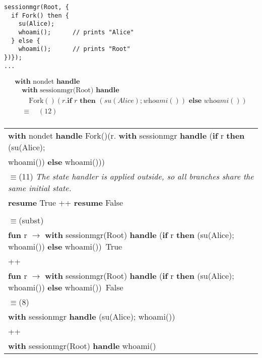 \documentclass[logo,bsc,singlespacing,parskip]{infthesis}
\begin{document}
\begin{tcolorbox}[examplebox, title=Practical Example: Inheriting environment variables]


\begin{lstlisting}
sessionmgr(Root, {
  if Fork() then {
    su(Alice);
    whoami();      // prints "Alice"
  } else {
    whoami();      // prints "Root"
})});
...
\end{lstlisting}
\[
\begin{array}{l}
\textbf{with } \text{nondet} \textbf{ handle } \\
\quad \textbf{with } \text{sessionmgr(Root)} \textbf{ handle } \\
\quad\quad \text{Fork}()(r. \textbf{if } r \textbf{ then } (su(Alice); \textit{whoami}()) \textbf{ else } \textit{whoami}()) \\[5pt]
\quad\equiv\quad (12) \\
\end{array}
\]

\begin{longtable}{@{}l@{}}
\textbf{with } nondet \textbf{ handle } Fork()(r. \textbf{with } sessionmgr \textbf{ handle } (\textbf{if } r \textbf{ then } (su(Alice); \\ whoami()) \textbf{ else } whoami())) \\

\quad$\equiv$\quad (11) \textit{The state handler is applied outside, so all branches share the same initial state.} \\
\textbf{resume } True ++ \textbf{resume } False \\
 \\

\quad$\equiv$\quad (subst) \\
\textbf{fun } r $\rightarrow$ \textbf{with } sessionmgr(Root) \textbf{ handle } (\textbf{if } r \textbf{ then } (su(Alice); whoami()) \textbf{ else } whoami())\ True \\
++ \\
\textbf{fun } r $\rightarrow$ \textbf{with } sessionmgr(Root) \textbf{ handle } (\textbf{if } r \textbf{ then } (su(Alice); whoami()) \textbf{ else } whoami())\ False \\

\quad$\equiv$\quad (8) \\
\textbf{with } sessionmgr \textbf{ handle } (su(Alice); whoami()) \\
++ \\
\textbf{with } sessionmgr(Root) \textbf{ handle } whoami() \\


\end{longtable}
\end{tcolorbox}
\end{document}
